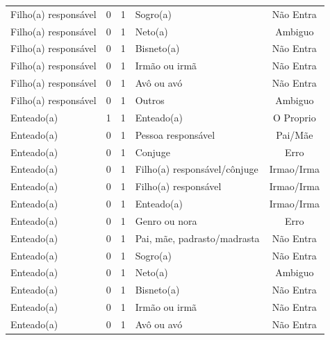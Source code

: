 \documentclass[
	12pt,				%
	openright,			%
	twoside,			%
	a4paper,			%
	english,			%
	french,				%
	spanish,			%
	brazil				%
	]{abntex2}
\begin{document}
\begin{anexosenv}
\begin{longtable}{@{}lcclc@{}}
Filho(a) responsável         & 0         & 1        & Sogro(a)                     & Não Entra       \\
Filho(a) responsável         & 0         & 1        & Neto(a)                      & Ambiguo         \\
Filho(a) responsável         & 0         & 1        & Bisneto(a)                   & Não Entra       \\
Filho(a) responsável         & 0         & 1        & Irmão ou irmã                & Não Entra       \\
Filho(a) responsável         & 0         & 1        & Avô ou avó                   & Não Entra       \\
Filho(a) responsável         & 0         & 1        & Outros                       & Ambiguo         \\
Enteado(a)                   & 1         & 1        & Enteado(a)                   & O Proprio       \\
Enteado(a)                   & 0         & 1        & Pessoa responsável           & Pai/Mãe         \\
Enteado(a)                   & 0         & 1        & Conjuge                      & Erro            \\
Enteado(a)                   & 0         & 1        & Filho(a) responsável/cônjuge & Irmao/Irma      \\
Enteado(a)                   & 0         & 1        & Filho(a) responsável         & Irmao/Irma      \\
Enteado(a)                   & 0         & 1        & Enteado(a)                   & Irmao/Irma      \\
Enteado(a)                   & 0         & 1        & Genro ou nora                & Erro            \\
Enteado(a)                   & 0         & 1        & Pai, mãe, padrasto/madrasta  & Não Entra       \\
Enteado(a)                   & 0         & 1        & Sogro(a)                     & Não Entra       \\
Enteado(a)                   & 0         & 1        & Neto(a)                      & Ambiguo         \\
Enteado(a)                   & 0         & 1        & Bisneto(a)                   & Não Entra       \\
Enteado(a)                   & 0         & 1        & Irmão ou irmã                & Não Entra       \\
Enteado(a)                   & 0         & 1        & Avô ou avó                   & Não Entra       \\

\end{longtable}
\end{anexosenv}
\end{document}
